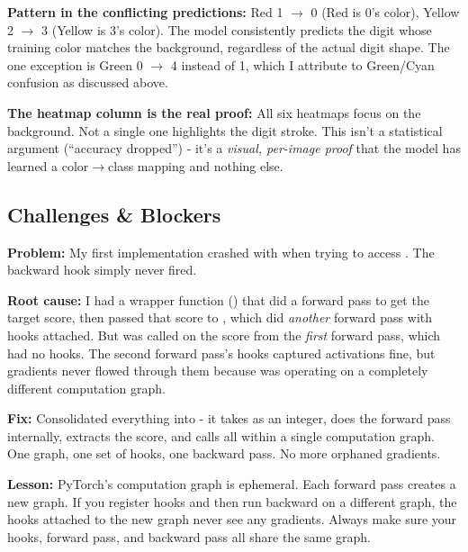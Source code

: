 \documentclass[9pt,a4paper,twocolumn,twoside]{tau-class/tau}
\begin{document}
        \begin{note}
            \textbf{Pattern in the conflicting predictions:} Red 1 $\rightarrow$ 0 (Red is 0's color), Yellow 2 $\rightarrow$ 3 (Yellow is 3's color). The model consistently predicts the digit whose training color matches the background, regardless of the actual digit shape. The one exception is Green 0 $\rightarrow$ 4 instead of 1, which I attribute to Green/Cyan confusion as discussed above.

            \textbf{The heatmap column is the real proof:} All six heatmaps focus on the background. Not a single one highlights the digit stroke. This isn't a statistical argument (``accuracy dropped'') - it's a \textit{visual, per-image proof} that the model has learned a color$\rightarrow$class mapping and nothing else.
        \end{note}


    \subsection{Challenges \& Blockers}

        \begin{tauenv}[frametitle={Bug: KeyError on gradients - The Dual Forward Pass Problem}]
            \textbf{Problem:} My first implementation crashed with  when trying to access . The backward hook simply never fired.

            \textbf{Root cause:} I had a wrapper function () that did a forward pass to get the target score, then passed that score to , which did \textit{another} forward pass with hooks attached. But  was called on the score from the \textit{first} forward pass, which had no hooks. The second forward pass's hooks captured activations fine, but gradients never flowed through them because  was operating on a completely different computation graph.

            \textbf{Fix:} Consolidated everything into  - it takes  as an integer, does the forward pass internally, extracts the score, and calls  all within a single computation graph. One graph, one set of hooks, one backward pass. No more orphaned gradients.

            \textbf{Lesson:} PyTorch's computation graph is ephemeral. Each forward pass creates a new graph. If you register hooks and then run backward on a different graph, the hooks attached to the new graph never see any gradients. Always make sure your hooks, forward pass, and backward pass all share the same graph.
        \end{tauenv}
\end{document}
